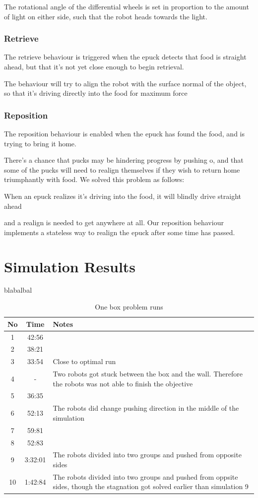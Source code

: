 \documentclass{article}
\begin{document}
The rotational angle of the differential wheels is set in proportion to the amount of light on either side, such that the robot heads towards the light.

\subsubsection{Retrieve}
The retrieve behaviour is triggered when the epuck detects that food is straight ahead, but that it's not yet close enough to begin retrieval.

The behaviour will try to align the robot with the surface normal of the object, so that it's driving directly into the food for maximum force

\subsubsection{Reposition}
The reposition behaviour is enabled when the epuck has found the food, and is trying to bring it home. 

There's a chance that pucks may be hindering progress by pushing o, and that some of the pucks will need to realign themselves if they wish to return home triumphantly with food. We solved this problem as follows:

When an epuck realizes it's driving into the food, it will blindly drive straight ahead


 and a realign is needed to get anywhere at all. Our reposition behaviour implements a stateless way to realign the epuck after some time has passed. 

\section{Simulation Results}
blabalbal
\begin{table}[h!]
\centering
\begin{tabular}{ c | c | p{5cm}}
\hline No & Time & Notes \\ \hline
 1 & 42:56 &  \\ \hline
 2 & 38:21 & \\ \hline
 3 & 33:54 & Close to optimal run \\ \hline
4 & - & Two robots got stuck between the box and the wall. Therefore the robots was not able to finish the objective \\ \hline
5 & 36:35 & \\ \hline
6	& 52:13 & The robots did change pushing direction in the middle of the simulation \\ \hline
7 & 59:81 & \\ \hline
8 & 52:83 & \\ \hline
9 & 3:32:01 &  The robots divided into two groups and pushed from opposite sides \\ \hline
10 & 1:42:84 & The robots divided into two groups and pushed from oppsite sides, though the stagnation got solved earlier than simulation 9 \\
\end{tabular}
\caption{One box problem runs}
\end{table}
\end{document}
